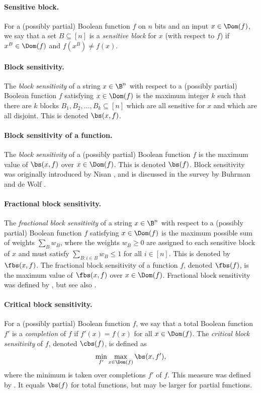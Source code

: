 \paragraph{Sensitive block.} For a (possibly partial) Boolean
function $f$ on $n$ bits and an input $x\in\Dom(f)$, we say that
a set $B\subseteq[n]$ is a \emph{sensitive block} for $x$
(with respect to $f$) if $x^B\in\Dom(f)$ and $f(x^B)\ne f(x)$.

\paragraph{Block sensitivity.} The \emph{block sensitivity}
of a string $x\in\B^n$ with respect to a (possibly partial)
Boolean function $f$ satisfying $x\in\Dom(f)$ is the maximum
integer $k$ such that there are $k$ blocks
$B_1,B_2,\dots,B_k\subseteq[n]$ which are all sensitive
for $x$ and which are all disjoint. This is denoted
$\bs(x,f)$.

\paragraph{Block sensitivity of a function.} The
\emph{block sensitivity} of a (possibly partial) Boolean function
$f$ is the maximum value of $\bs(x,f)$ over $x\in\Dom(f)$.
This is denoted $\bs(f)$.
Block sensitivity was originally introduced by Nisan
\cite{Nis91}, and is discussed in the survey by Buhrman and
de Wolf \cite{BdW02}.

\paragraph{Fractional block sensitivity.} The
\emph{fractional block sensitivity} of a string $x\in\B^n$
with respect to a (possibly partial) Boolean function $f$
satisfying $x\in\Dom(f)$ is the maximum possible
sum of weights $\sum_B w_B$, where the weights $w_B\ge 0$
are assigned to each sensitive block of $x$ and must satisfy
$\sum_{B:i\in B} w_B\le 1$ for all $i\in[n]$.
This is denoted by $\fbs(x,f)$. The fractional block sensitivity
of a function $f$, denoted $\fbs(f)$, is the maximum value of
$\fbs(x,f)$ over $x\in\Dom(f)$.
Fractional block sensitivity was defined by \cite{Aar08},
but see also \cite{KT16}.

\paragraph{Critical block sensitivity.}
For a (possibly partial) Boolean function $f$, we say that
a total Boolean function $f'$ is a \emph{completion} of $f$
if $f'(x)=f(x)$ for all $x\in\Dom(f)$. The \emph{critical block
sensitivity} of $f$, denoted $\cbs(f)$, is defined as
\[\min_{f'}\max_{x\in\Dom(f)}\bs(x,f'),\]
where the minimum is taken over completions $f'$ of $f$.
This measure was defined by \cite{HN12}. It equals $\bs(f)$
for total functions, but may be larger for partial functions.

